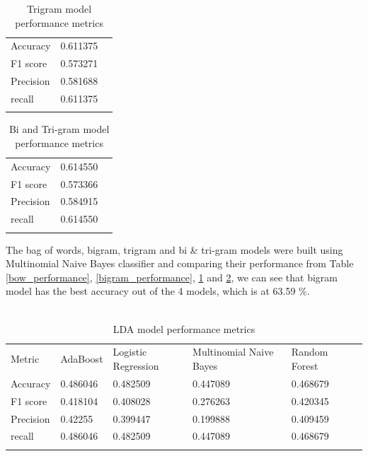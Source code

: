 \documentclass[paper=a4, fontsize=11pt]{scrartcl} %
\numberwithin{equation}{section} %
\numberwithin{figure}{section} %
\numberwithin{table}{section} %
\begin{document}
\begin{table}[!htb]
 \centering
 \caption{Trigram model performance metrics}
 \label{trigram_performance}
 \begin{tabular}{l l l} 
    \noalign{\smallskip}\hline\noalign{\smallskip}
    Accuracy & 0.611375\\
    F1 score & 0.573271\\
    Precision & 0.581688\\
    recall & 0.611375\\
    \noalign{\smallskip}\hline
  \end{tabular} 
\end{table}  

\begin{table}[!htb]
 \centering
 \caption{Bi and Tri-gram model performance metrics}
 \label{biandtri_performance}
 \begin{tabular}{l l l} 
    \noalign{\smallskip}\hline\noalign{\smallskip}
    Accuracy & 0.614550\\
    F1 score & 0.573366\\
    Precision & 0.584915\\
    recall & 0.614550\\
    \noalign{\smallskip}\hline
  \end{tabular} 
\end{table}  

The bag of words, bigram, trigram and bi \& tri-gram models were built using Multinomial Naive Bayes classifier and comparing their performance from Table \ref{bow_performance}, \ref{bigram_performance}, \ref{trigram_performance} and \ref{biandtri_performance}, we can see that bigram model has the best accuracy out of the 4 models, which is at 63.59 \%.\\\\

\begin{table}[!htb]
 \centering
 \caption{LDA model performance metrics}
 \label{lda_performance}
 \begin{tabular}{l l l l l l} 
    \noalign{\smallskip}\hline\noalign{\smallskip}
    Metric & AdaBoost & Logistic Regression & \multicolumn{1}{p{3cm}}{Multinomial Naive Bayes} & Random Forest\\
    \noalign{\smallskip}\hline\noalign{\smallskip}
    Accuracy & 0.486046	&0.482509	&0.447089	&0.468679\\
    F1 score & 0.418104	&0.408028	&0.276263	&0.420345\\
    Precision & 	0.42255	&0.399447	&0.199888	&0.409459\\
    recall & 	0.486046	&0.482509	&0.447089	&0.468679\\
    \noalign{\smallskip}\hline
  \end{tabular}
\end{table}  
\end{document}
